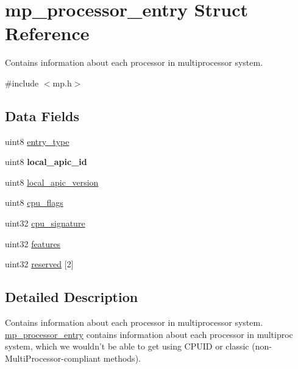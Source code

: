 \hypertarget{structmp__processor__entry}{
\section{mp\_\-processor\_\-entry Struct Reference}
\label{structmp__processor__entry}
}


Contains information about each processor in multiprocessor system.  




{\ttfamily \#include $<$mp.h$>$}

\subsection*{Data Fields}
\begin{DoxyCompactItemize}
\item 
uint8 \hyperlink{structmp__processor__entry_a9bfed0bbe2ddc426309892a4ad178e62}{entry\_\-type}
\item 
\hypertarget{structmp__processor__entry_a915caa7ce43d59359ac3c538d8abc446}{
uint8 {\bfseries local\_\-apic\_\-id}}
\label{structmp__processor__entry_a915caa7ce43d59359ac3c538d8abc446}

\item 
uint8 \hyperlink{structmp__processor__entry_a3d219542868b41a3d6c7f45c2d410384}{local\_\-apic\_\-version}
\item 
uint8 \hyperlink{structmp__processor__entry_a3c0959d25eccf5ae21e3129d7a30d6b0}{cpu\_\-flags}
\item 
uint32 \hyperlink{structmp__processor__entry_adcc102b4f90141aa248c8f3a8db6b858}{cpu\_\-signature}
\item 
uint32 \hyperlink{structmp__processor__entry_a0fee8cc04e85fd4f0622cbbbc8a6832f}{features}
\item 
uint32 \hyperlink{structmp__processor__entry_ab08df8af478d26004574301447ded14d}{reserved} \mbox{[}2\mbox{]}
\end{DoxyCompactItemize}


\subsection{Detailed Description}
Contains information about each processor in multiprocessor system. \hyperlink{structmp__processor__entry}{mp\_\-processor\_\-entry} contains information about each processor in multiproc system, which we wouldn't be able to get using CPUID or classic (non-\/MultiProcessor-\/compliant methods). 

